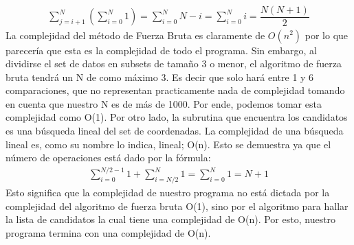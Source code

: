 \begin{align*}
    \sum_{j=i+1}^{N}{\left(
        \sum_{i=0}^{N}{1}
    \right)} =  \sum_{i=0}^{N}{N-i} = \sum_{i=0}^{N}{i} = \dfrac{N(N+1)}{2}
\end{align*}
La complejidad del método de Fuerza Bruta es claramente de $O(n^2)$ por lo que parecería que esta es la complejidad de todo el programa. Sin embargo, al dividirse el set de datos en subsets de tamaño 3 o menor, el algoritmo de fuerza bruta tendrá un N de como máximo 3. Es decir que solo hará entre 1 y 6 comparaciones, que no representan practicamente nada de complejidad tomando en cuenta que nuestro N es de más de 1000. Por ende, podemos tomar esta complejidad como O(1). Por otro lado, la subrutina que encuentra los candidatos es una búsqueda lineal del set de coordenadas. La complejidad de una búsqueda lineal es, como su nombre lo indica, lineal; O(n). Esto se demuestra ya que el número de operaciones está dado por la fórmula:
\begin{align*}
    \sum_{i=0}^{N/2-1}{1} + \sum_{i=N/2}^{N}{1} =  \sum_{i=0}^{N}{1} = N+1
\end{align*}
Esto significa que la complejidad de nuestro programa no está dictada por la complejidad del algoritmo de fuerza bruta O(1), sino por el algoritmo para hallar la lista de candidatos la cual tiene una complejidad de O(n). Por esto, nuestro programa termina con una complejidad de O(n).



